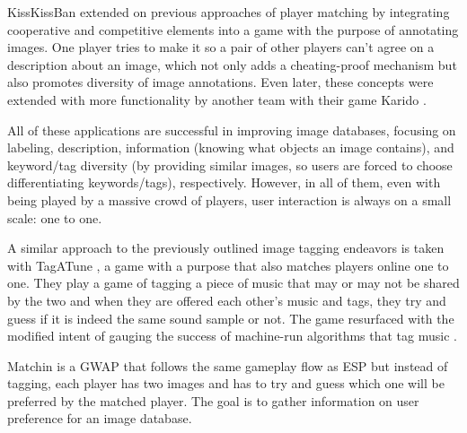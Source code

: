 \documentclass[preprint,authoryear,12pt]{elsarticle}
\makeatletter
\renewcommand{\paragraph}{\@startsection{paragraph}{4}{\z@}%
  {-3.25ex\@plus -1ex \@minus -.2ex}%
  {1.5ex \@plus .2ex}%
  {\normalfont\normalsize\mdseries}}
\makeatother
\begin{document}
KissKissBan \citep{Ho:2009} extended on previous approaches of player matching by integrating cooperative and competitive elements into a game with the purpose of annotating images. One player tries to make it so a pair of other players can't agree on a description about an image, which not only adds a cheating-proof mechanism but also promotes diversity of image annotations. Even later, these concepts were extended with more functionality by another team with their game Karido \citep{steinmayr2011karido}.

All of these applications are successful in improving image databases, focusing on labeling, description, information (knowing what objects an image contains), and keyword/tag diversity (by providing similar images, so users are forced to choose differentiating keywords/tags), respectively. However, in all of them, even with being played by a massive crowd of players, user interaction is always on a small scale: one to one.


A similar approach to the previously outlined image tagging endeavors is taken with TagATune \citep{Law:2009}, a game with a purpose that also matches players online one to one. They play a game of tagging a piece of music that may or may not be shared by the two and when they are offered each other's music and tags, they try and guess if it is indeed the same sound sample or not. The game resurfaced with the modified intent of gauging the success of machine-run algorithms that tag music \citep{vonAhn&Law:2009}.


Matchin \citep{Hacker:2009} is a GWAP that follows the same gameplay flow as ESP but instead of tagging, each player has two images and has to try and guess which one will be preferred by the matched player. The goal is to gather information on user preference for an image database.

\end{document}
